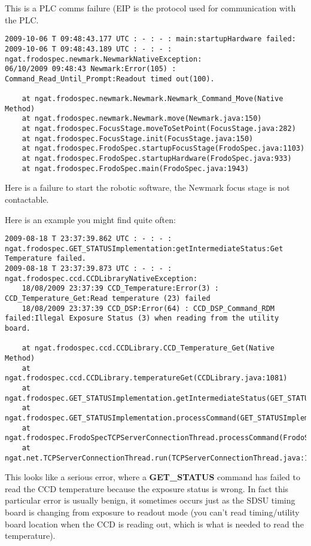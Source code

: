 \documentclass[10pt,a4paper]{article}
\begin{document}
This is a PLC comms failure (EIP is the protocol used for communication with the PLC.

\begin{verbatim}
2009-10-06 T 09:48:43.177 UTC : - : - : main:startupHardware failed:
2009-10-06 T 09:48:43.189 UTC : - : - : ngat.frodospec.newmark.NewmarkNativeException: 
06/10/2009 09:48:43 Newmark:Error(105) : Command_Read_Until_Prompt:Readout timed out(100).

	at ngat.frodospec.newmark.Newmark.Newmark_Command_Move(Native Method)
	at ngat.frodospec.newmark.Newmark.move(Newmark.java:150)
	at ngat.frodospec.FocusStage.moveToSetPoint(FocusStage.java:282)
	at ngat.frodospec.FocusStage.init(FocusStage.java:150)
	at ngat.frodospec.FrodoSpec.startupFocusStage(FrodoSpec.java:1103)
	at ngat.frodospec.FrodoSpec.startupHardware(FrodoSpec.java:933)
	at ngat.frodospec.FrodoSpec.main(FrodoSpec.java:1943)
\end{verbatim}

Here is a failure to start the robotic software, the Newmark focus stage is not contactable.

Here is an example you might find quite often:

\begin{verbatim}
2009-08-18 T 23:37:39.862 UTC : - : - : ngat.frodospec.GET_STATUSImplementation:getIntermediateStatus:Get Temperature failed.
2009-08-18 T 23:37:39.873 UTC : - : - : ngat.frodospec.ccd.CCDLibraryNativeException: 
	18/08/2009 23:37:39 CCD_Temperature:Error(3) : CCD_Temperature_Get:Read temperature (23) failed
	18/08/2009 23:37:39 CCD_DSP:Error(64) : CCD_DSP_Command_RDM failed:Illegal Exposure Status (3) when reading from the utility board.

	at ngat.frodospec.ccd.CCDLibrary.CCD_Temperature_Get(Native Method)
	at ngat.frodospec.ccd.CCDLibrary.temperatureGet(CCDLibrary.java:1081)
	at ngat.frodospec.GET_STATUSImplementation.getIntermediateStatus(GET_STATUSImplementation.java:520)
	at ngat.frodospec.GET_STATUSImplementation.processCommand(GET_STATUSImplementation.java:280)
	at ngat.frodospec.FrodoSpecTCPServerConnectionThread.processCommand(FrodoSpecTCPServerConnectionThread.java:268)
	at ngat.net.TCPServerConnectionThread.run(TCPServerConnectionThread.java:188)
\end{verbatim}

This looks like a serious error, where a {\bf GET\_STATUS} command has failed to read the CCD temperature because the exposure status is wrong. In fact this particular error is usually benign, it sometimes occurs just as the SDSU timing board is changing from exposure to readout mode (you can't read timing/utility board location when the CCD is reading out, which is what is needed to read the temperature).
\end{document}
